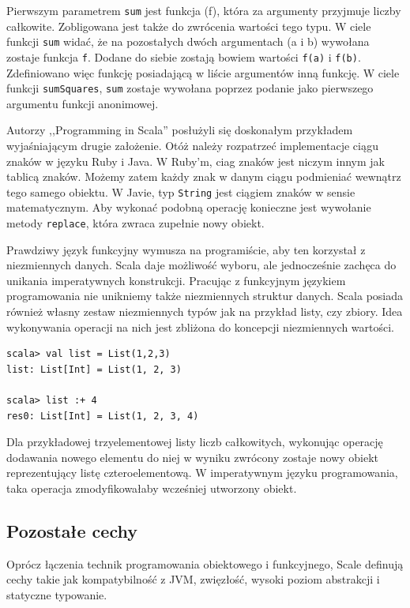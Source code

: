 \documentclass[brudnopis]{xmgr}
\begin{document}
Pierwszym parametrem \texttt{sum} jest funkcja (f), która za argumenty przyjmuje liczby całkowite. Zobligowana jest także do zwrócenia wartości tego typu. W ciele funkcji \texttt{sum} widać, że na pozostałych dwóch argumentach (a i b) wywołana zostaje funkcja \texttt{f}. Dodane do siebie zostają bowiem wartości \texttt{f(a)} i \texttt{f(b)}. Zdefiniowano więc funkcję posiadającą w liście argumentów inną funkcję. W ciele funkcji \texttt{sumSquares}, \texttt{sum} zostaje wywołana poprzez podanie jako pierwszego argumentu funkcji anonimowej.

Autorzy ,,Programming in Scala'' posłużyli się doskonałym przykładem wyjaśniającym drugie założenie. \cite[s.57]{Odersky:2010:PIS} Otóż należy rozpatrzeć implementacje ciągu znaków w języku Ruby i Java. W Ruby'm, ciag znaków jest niczym innym jak tablicą znaków. Możemy zatem każdy znak w danym ciągu podmieniać wewnątrz tego samego obiektu. W Javie, typ \texttt{String} jest ciągiem znaków w sensie matematycznym. Aby wykonać podobną operację konieczne jest wywołanie metody \texttt{replace}, która zwraca zupełnie nowy obiekt.

Prawdziwy język funkcyjny wymusza na programiście, aby ten korzystał z niezmiennych danych. Scala daje możliwość wyboru, ale jednocześnie zachęca do unikania imperatywnych konstrukcji. Pracując z funkcyjnym językiem programowania nie unikniemy także niezmiennych struktur danych. Scala posiada również własny zestaw niezmiennych typów jak na przykład listy, czy zbiory. Idea wykonywania operacji na nich jest zbliżona do koncepcji niezmiennych wartości.

\begin{verbatim}
scala> val list = List(1,2,3)
list: List[Int] = List(1, 2, 3)

scala> list :+ 4
res0: List[Int] = List(1, 2, 3, 4)
\end{verbatim}

Dla przykładowej trzyelementowej listy liczb całkowitych, wykonując operację dodawania nowego elementu do niej w wyniku zwrócony zostaje nowy obiekt reprezentujący listę czteroelementową. W imperatywnym języku programowania, taka operacja zmodyfikowałaby wcześniej utworzony obiekt. 

\subsection{Pozostałe cechy}

Oprócz łączenia technik programowania obiektowego i funkcyjnego, Scale definują cechy takie jak kompatybilność z JVM, zwięzłość, wysoki poziom abstrakcji i statyczne typowanie. 
\end{document}
